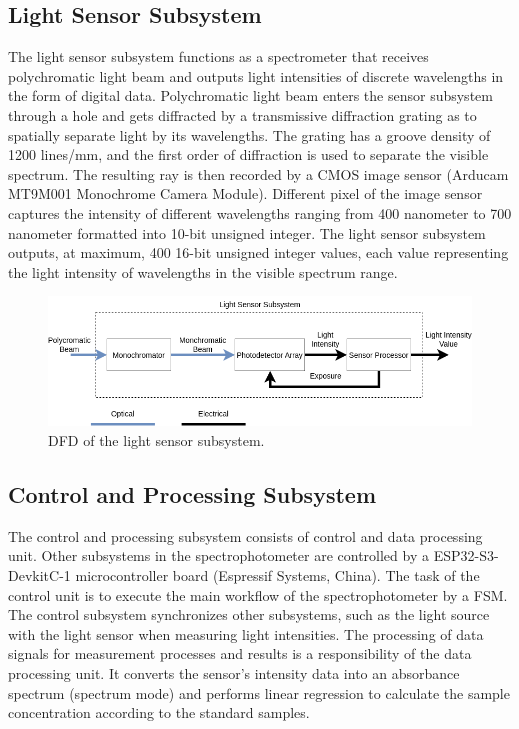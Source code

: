 \documentclass[conference]{IEEEtran}
\begin{document}
\subsection{Light Sensor Subsystem}
The light sensor subsystem functions as a spectrometer that receives polychromatic light beam and outputs light intensities of discrete wavelengths in the form of digital data.
Polychromatic light beam enters the sensor subsystem through a hole and gets diffracted by a transmissive diffraction grating as to spatially separate light by its wavelengths.
The grating has a groove density of 1200 lines/mm, and the first order of diffraction is used to separate the visible spectrum.
The resulting ray is then recorded by a CMOS image sensor (Arducam MT9M001 Monochrome Camera Module).
Different pixel of the image sensor captures the intensity of different wavelengths ranging from 400 nanometer to 700 nanometer formatted into 10-bit unsigned integer.
The light sensor subsystem outputs, at maximum, 400 16-bit unsigned integer values, each value representing the light intensity of wavelengths in the visible spectrum range. 

    \begin{figure}[htbp]
    \centerline{\includegraphics[scale=0.33]{light-sensor-dfd.png}}
    \caption{DFD of the light sensor subsystem.}
    \label{light-sensor-dfd}
    \end{figure}

\subsection{Control and Processing Subsystem}
The control and processing subsystem consists of control and data processing unit.
Other subsystems in the spectrophotometer are controlled by a ESP32-S3-DevkitC-1 microcontroller board (Espressif Systems, China).
The task of the control unit is to execute the main workflow of the spectrophotometer by a FSM.
The control subsystem synchronizes other subsystems, such as the light source with the light sensor when measuring light intensities.
The processing of data signals for measurement processes and results is a responsibility of the data processing unit.
It converts the sensor's intensity data into an absorbance spectrum (spectrum mode) and performs linear regression to calculate the sample concentration according to the standard samples.
\end{document}
